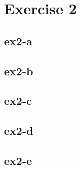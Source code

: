 \section{Exercise 2}
\subsection{ex2-a}

\subsection{ex2-b}

\subsection{ex2-c}

\subsection{ex2-d}

\subsection{ex2-e}